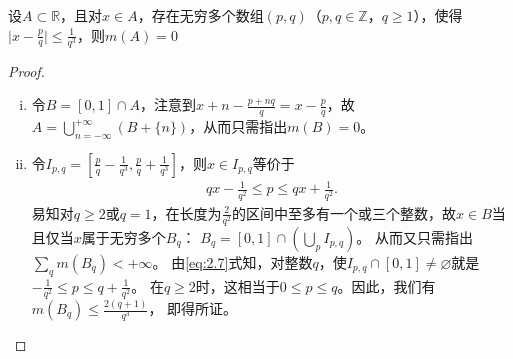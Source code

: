 \documentclass[../../main.tex]{subfiles}%
\begin{document}
\begin{example}
设\(A\subset\mathbb{R}\)，且对\(x\in A\)，存在无穷多个数组\((p,q)\)（\(p,q\in\mathbb{Z}\)，\(q\geqslant1\)），使得\(\vert x - \frac{p}{q}\vert\leqslant \frac{1}{q^3}\)，则\(m(A)=0\)
\end{example}
\begin{proof}
\begin{enumerate}[(i)]
\item 令\(B = [0,1]\cap A\)，注意到\(x + n-\frac{p + nq}{q}=x - \frac{p}{q}\)，故\(A=\bigcup_{n = -\infty}^{+\infty}(B+\{n\})\)，从而只需指出\(m(B)=0\)。
\item 令\(I_{p,q}=\left[\frac{p}{q}-\frac{1}{q^3},\frac{p}{q}+\frac{1}{q^3}\right]\)，则\(x\in I_{p,q}\)等价于
\begin{align}
qx-\frac{1}{q^2}\leqslant p\leqslant qx+\frac{1}{q^2}.\label{eq:2.7}
\end{align}
易知对\(q\geqslant2\)或\(q = 1\)，在长度为\(\frac{2}{q^2}\)的区间中至多有一个或三个整数，故\(x\in B\)当且仅当\(x\)属于无穷多个\(B_q\)：
\(B_q = [0,1]\cap\left(\bigcup_{p}I_{p,q}\right)\)。
从而又只需指出\(\sum_{q}m(B_q)<+\infty\)。
由\eqref{eq:2.7}式知，对整数\(q\)，使\(I_{p,q}\cap[0,1]\neq\varnothing\)就是
\(-\frac{1}{q^2}\leqslant p\leqslant q+\frac{1}{q^2}\)。
在\(q\geqslant2\)时，这相当于\(0\leqslant p\leqslant q\)。因此，我们有
\(m(B_q)\leqslant \frac{2(q+1)}{q^3}\)，
即得所证。
\end{enumerate} 
\end{proof}
\end{document}
